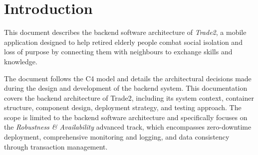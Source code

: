 \section{Introduction}\label{sec:introduction}
This document describes the backend software architecture of \textit{Trade2}, a mobile application designed to help retired elderly people combat social isolation and loss of purpose by connecting them with neighbours to exchange skills and knowledge.

The document follows the C4 model and details the architectural decisions made during the design and development of the backend system.
This documentation covers the backend architecture of Trade2, including its system context, container structure, component design, deployment strategy, and testing approach.
The scope is limited to the backend software architecture and specifically focuses on the \emph{Robustness \& Availability} advanced track, which encompasses zero-downtime deployment, comprehensive monitoring and logging, and data consistency through transaction management.
